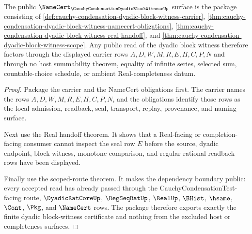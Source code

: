 \begin{theorem}
\label{thm:cauchy-condensation-dyadic-block-witness-public-certificate}
The public $\NameCert_{\CauchyCondensationDyadicBlockWitnessUp}$ surface is the package consisting of \autoref{def:cauchy-condensation-dyadic-block-witness-carrier}, \autoref{thm:cauchy-condensation-dyadic-block-witness-namecert-obligations}, \autoref{thm:cauchy-condensation-dyadic-block-witness-real-handoff}, and \autoref{thm:cauchy-condensation-dyadic-block-witness-scope}. Any public read of the dyadic block witness therefore factors through the displayed carrier rows $A,D,W,M,R,E,H,C,P,N$ and through no host summability theorem, equality of infinite series, selected sum, countable-choice schedule, or ambient Real-completeness datum.
\end{theorem}
\begin{proof}
Package the carrier and the NameCert obligations first. The carrier names the rows $A,D,W,M,R,E,H,C,P,N$, and the obligations identify those rows as the local admission, readback, seal, transport, replay, provenance, and naming surface.

Next use the Real handoff theorem. It shows that a Real-facing or completion-facing consumer cannot inspect the seal row $E$ before the source, dyadic endpoint, block witness, monotone comparison, and regular rational readback rows have been displayed.

Finally use the scoped-route theorem. It makes the dependency boundary public: every accepted read has already passed through the CauchyCondensationTest-facing route, $\DyadicRatCoreUp$, $\RegSeqRatUp$, $\RealUp$, $\BHist$, $\hsame$, $\Cont$, $\Pkg$, and $\NameCert$ rows. The package therefore exports exactly the finite dyadic block-witness certificate and nothing from the excluded host or completeness surfaces.
\end{proof}




